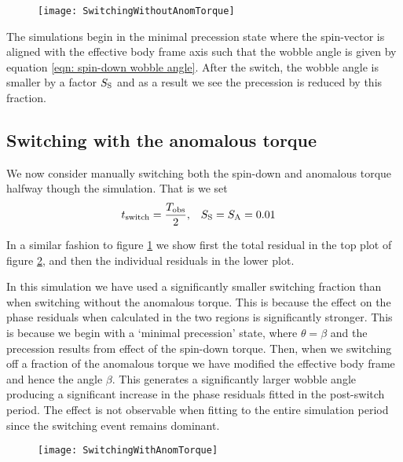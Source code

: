 \documentclass[../full_thesis/full_thesis.tex]{subfiles}
\begin{document}
\begin{figure}[htb]
\texttt{[image: SwitchingWithoutAnomTorque]}
\caption{}
\label{fig: switching without anom}
\end{figure}

The simulations begin in the minimal precession state where the spin-vector
is aligned with the effective body frame axis such that the wobble angle is given
by equation \eqref{eqn: spin-down wobble angle}. After the switch, the wobble
angle is smaller by a factor $S_{\mathrm{S}}$ and as a result we see the precession is
reduced by this fraction.


\subsection{Switching with the anomalous torque}
We now consider manually switching both the spin-down and anomalous torque
halfway though the simulation.  That is we set
\begin{align}
    t_{\mathrm{switch}} = \frac{T_{\textrm{obs}}}{2}, &&& S_{\mathrm{S}} = S_{\mathrm{A}} = 0.01
\end{align}

In a similar fashion to figure \ref{fig: switching without anom} we show first
the total residual in the top plot of figure \ref{fig: switching with anom}, and
then the individual residuals in the lower plot.

In this simulation we have used a significantly smaller switching fraction 
than when switching without the anomalous torque. This is because the effect 
on the phase residuals when calculated in the two regions is significantly
stronger. This is because we begin with a `minimal precession' state, where
$\theta = \beta$ and the precession results from effect of the spin-down torque.
Then, when we switching off a fraction of the anomalous torque we have modified
the effective body frame and hence the angle $\beta$. This generates a significantly
larger wobble angle producing a significant increase in the phase residuals
fitted in the post-switch period. The effect is not observable when fitting
to the entire simulation period since the switching event remains dominant.

\begin{figure}[htb]
\texttt{[image: SwitchingWithAnomTorque]}
\caption{}
\label{fig: switching with anom}
\end{figure}
\end{document}
